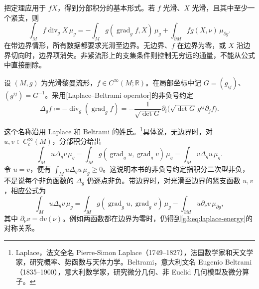 把定理应用于 \(fX\)，得到分部积分的基本形式。若 \(f\) 光滑、\(X\) 光滑，且其中至少一个紧支，则
\begin{equation}
	\label{g3:eq:integration-by-parts}
	\int_M f\operatorname{div}_gX\,\mu_g
	=-\int_M g(\operatorname{grad}_g f,X)\,\mu_g
	+\int_{\partial M}f g(X,\nu)\,\mu_{\partial g}.
\end{equation}
在带边界情形，所有数据都要求光滑至边界。无边界、\(f\) 在边界为零，或 \(X\) 沿边界切向时，边界项消失。非紧流形上的支集条件则控制无穷远的通量，不能从公式中直接删除。

\begin{definition}
	\label{g3:def:laplace-beltrami}
	设 \((M,g)\) 为光滑黎曼流形，\(f\in C^\infty(M;\mathbb R)\)。在局部坐标中记 \(G=(g_{ij})\)、\((g^{ij})=G^{-1}\)。采用[Laplace--Beltrami operator]的非负号约定
	\begin{equation}
		\label{g3:eq:laplace-beltrami}
		\Delta_g f\coloneqq-\operatorname{div}_g(\operatorname{grad}_g f)
		=-\frac1{\sqrt{\det G}}
		\partial_i\bigl(\sqrt{\det G}\,g^{ij}\partial_jf\bigr).
	\end{equation}
\end{definition}


这个名称沿用 Laplace 和 Beltrami 的姓氏。\footnote{Laplace，法文全名 Pierre-Simon Laplace（1749--1827），法国数学家和天文学家，研究概率、势函数与天体力学。Beltrami，意大利文名 Eugenio Beltrami（1835--1900），意大利数学家，研究微分几何、非 Euclid 几何模型及微分算子。}具体说，无边界时，对 \(u,v\in C_c^\infty(M)\)，分部积分给出
\begin{equation}
	\label{g3:eq:laplace-energy}
	\int_M u\Delta_gv\,\mu_g
	=\int_M g(\operatorname{grad}_g u,\operatorname{grad}_g v)\,\mu_g
	=\int_M v\Delta_gu\,\mu_g.
\end{equation}
令 \(u=v\)，便有 \(\int_Mu\Delta_gu\,\mu_g\geq0\)。这说明本书的非负号约定指积分二次型非负，不是说每个非负函数的 \(\Delta_g\) 仍逐点非负。带边界时，对光滑至边界的紧支函数 \(u,v\)，相应公式为
\[
	\int_Mu\Delta_gv\,\mu_g
	=\int_M g(\operatorname{grad}_g u,\operatorname{grad}_g v)\,\mu_g
	-\int_{\partial M}u\partial_\nu v\,\mu_{\partial g},
\]
其中 \(\partial_\nu v=\mathrm{d}v(\nu)\)。例如两函数都在边界为零时，仍得到\eqref{g3:eq:laplace-energy}的对称关系。

